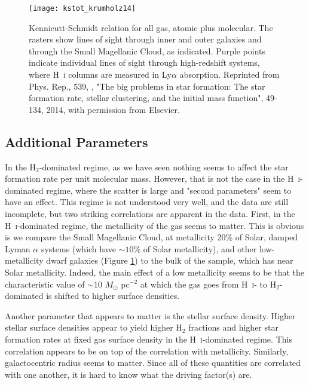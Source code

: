 \begin{figure}
\texttt{[image: kstot\_krumholz14]}
\caption[Kennicutt-Schmidt relation for total gas in resolved galaxies]{
\label{fig:kstot_krumholz14}
Kennicutt-Schmidt relation for all gas, atomic plus molecular. The rasters show lines of sight through inner and outer galaxies and through the Small Magellanic Cloud, as indicated. Purple points indicate individual lines of sight through high-redshift systems, where H~\textsc{i} columns are measured in Ly$\alpha$ absorption. Reprinted from Phys. Rep., 539, \citeauthor{krumholz14c}, "The big problems in star formation: The star formation rate, stellar clustering, and the initial mass function", 49-134, 2014, with permission from Elsevier.
}
\end{figure}


\subsection{Additional Parameters}

In the H$_2$-dominated regime, as we have seen nothing seems to affect the star formation rate per unit molecular mass. However, that is not the case in the H~\textsc{i}-dominated regime, where the scatter is large and "second parameters" seem to have an effect. This regime is not understood very well, and the data are still incomplete, but two striking correlations are apparent in the data. First, in the H~\textsc{i}-dominated regime, the metallicity of the gas seems to matter. This is obvious is we compare the Small Magellanic Cloud, at metallicity 20\% of Solar, damped Lyman $\alpha$ systems (which have $\sim 10\%$ of Solar metallicity), and other low-metallicity dwarf galaxies (Figure \ref{fig:kstot_krumholz14}) to the bulk of the sample, which has near Solar metallicity. Indeed, the main effect of a low metallicity seems to be that the characteristic value of $\sim 10$ $M_\odot$ pc$^{-2}$ at which the gas goes from H~\textsc{i}- to H$_2$-dominated is shifted to higher surface densities.

Another parameter that appears to matter is the stellar surface density. Higher stellar surface densities appear to yield higher H$_2$ fractions and higher star formation rates at fixed gas surface density in the H~\textsc{i}-dominated regime. This correlation appears to be on top of the correlation with metallicity. Similarly, galactocentric radius seems to matter. Since all of these quantities are correlated with one another, it is hard to know what the driving factor(s) are.

